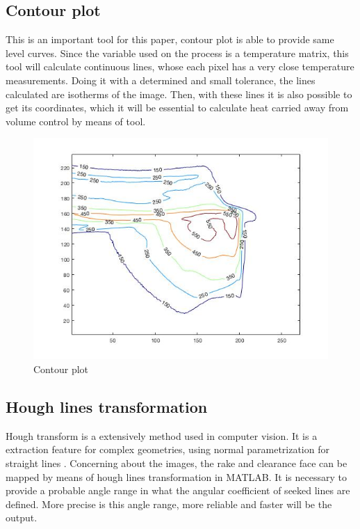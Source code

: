 	\subsection{Contour plot}
	\label{ch:seccontour}
	This is an important tool for this paper, contour plot is able to provide same level curves. Since the variable used on the process is a temperature matrix, this tool will calculate continuous lines, whose each pixel has a very close temperature measurements. Doing it with a determined and small tolerance, the lines calculated are isotherms of the image. Then, with these lines it is also possible to get its coordinates, which it will be essential to calculate heat carried away from volume control by means of tool.

	\begin{figure}[H]
		\centering
		\captionsetup{justification=centering}
		\includegraphics[scale=0.6]{Cap4/contour.jpg}
		\caption{Contour plot}
		\label{fig:contour}
	\end{figure}

	\subsection{Hough lines transformation}
	\label{ch:sechough}
	Hough transform is a extensively method used in computer vision. It is a extraction feature for complex geometries, using normal parametrization for straight lines \cite{duda1972use}. Concerning about the images, the rake and clearance face can be mapped by means of hough lines transformation in MATLAB. It is necessary to provide a probable angle range in what the angular coefficient of seeked lines are defined. More precise is this angle range, more reliable and faster will be the output.

